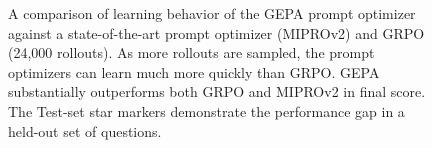 \documentclass{article} %
\begin{document}
\begin{figure}[!htp]
    \caption{A comparison of learning behavior of the GEPA prompt optimizer against a state-of-the-art prompt optimizer (MIPROv2) and GRPO (24,000 rollouts). As more rollouts are sampled, the prompt optimizers can learn much more quickly than GRPO. GEPA substantially outperforms both GRPO and MIPROv2 in final score. The Test-set star markers demonstrate the performance gap in a held-out set of questions.}\label{fig:agg_perf_qwen3_8b_true}
\end{figure}
\vspace{-2.5mm}
\end{document}
